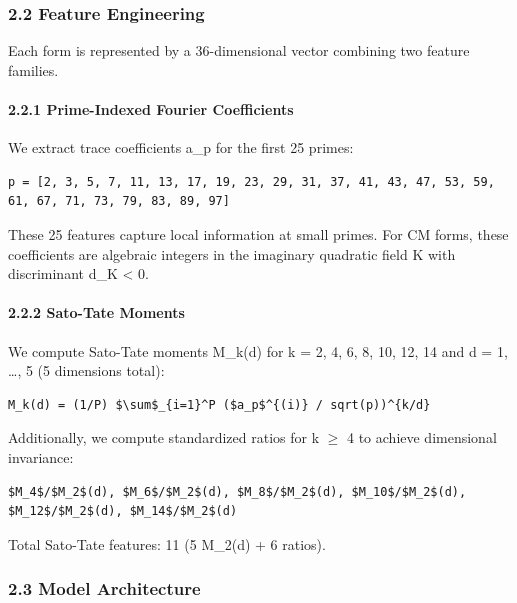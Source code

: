 \documentclass[
]{article}
\begin{document}
\hypertarget{feature-engineering}{%
\subsubsection{2.2 Feature Engineering}\label{feature-engineering}}

Each form is represented by a 36-dimensional vector combining two
feature families.

\hypertarget{prime-indexed-fourier-coefficients}{%
\paragraph{2.2.1 Prime-Indexed Fourier
Coefficients}\label{prime-indexed-fourier-coefficients}}

We extract trace coefficients a\_p for the first 25 primes:

\begin{verbatim}
p = [2, 3, 5, 7, 11, 13, 17, 19, 23, 29, 31, 37, 41, 43, 47, 53, 59, 61, 67, 71, 73, 79, 83, 89, 97]
\end{verbatim}

These 25 features capture local information at small primes. For CM
forms, these coefficients are algebraic integers in the imaginary
quadratic field K with discriminant d\_K \textless{} 0.

\hypertarget{sato-tate-moments}{%
\paragraph{2.2.2 Sato-Tate Moments}\label{sato-tate-moments}}

We compute Sato-Tate moments M\_k(d) for k = 2, 4, 6, 8, 10, 12, 14 and
d = 1, \ldots, 5 (5 dimensions total):

\begin{verbatim}
M_k(d) = (1/P) $\sum$_{i=1}^P ($a_p$^{(i)} / sqrt(p))^{k/d}
\end{verbatim}

Additionally, we compute standardized ratios for k $\ge$ 4 to achieve
dimensional invariance:

\begin{verbatim}
$M_4$/$M_2$(d), $M_6$/$M_2$(d), $M_8$/$M_2$(d), $M_10$/$M_2$(d), $M_12$/$M_2$(d), $M_14$/$M_2$(d)
\end{verbatim}

Total Sato-Tate features: 11 (5 M\_2(d) + 6 ratios).

\hypertarget{model-architecture}{%
\subsubsection{2.3 Model Architecture}\label{model-architecture}}
\end{document}
